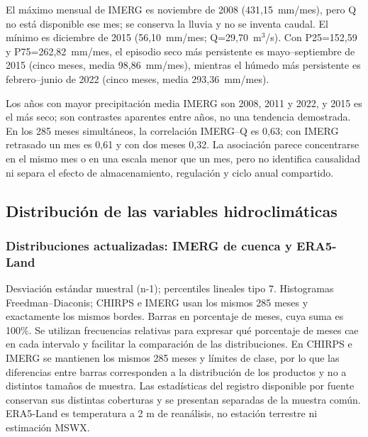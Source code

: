 \documentclass[10pt,a4paper]{article}
\begin{document}
El máximo mensual de IMERG es noviembre de 2008 (431,15~mm/mes), pero Q no está disponible ese mes; se conserva la lluvia y no se inventa caudal. El mínimo es diciembre de 2015 (56,10~mm/mes; Q=29,70~m$^3$/s). Con P25=152,59 y P75=262,82~mm/mes, el episodio seco más persistente es mayo--septiembre de 2015 (cinco meses, media 98,86~mm/mes), mientras el húmedo más persistente es febrero--junio de 2022 (cinco meses, media 293,36~mm/mes).

Los años con mayor precipitación media IMERG son 2008, 2011 y 2022, y 2015 es el más seco; son contrastes aparentes entre años, no una tendencia demostrada. En los 285 meses simultáneos, la correlación IMERG--Q es 0,63; con IMERG retrasado un mes es 0,61 y con dos meses 0,32. La asociación parece concentrarse en el mismo mes o en una escala menor que un mes, pero no identifica causalidad ni separa el efecto de almacenamiento, regulación y ciclo anual compartido.



\subsection{Distribución de las variables hidroclimáticas}
\subsubsection*{Distribuciones actualizadas: IMERG de cuenca y ERA5-Land}
Desviación estándar muestral (n-1); percentiles lineales tipo 7. Histogramas Freedman--Diaconis; CHIRPS e IMERG usan los mismos 285 meses y exactamente los mismos bordes. Barras en porcentaje de meses, cuya suma es 100\%. Se utilizan frecuencias relativas para expresar qué porcentaje de meses cae en cada intervalo y facilitar la comparación de las distribuciones. En CHIRPS e IMERG se mantienen los mismos 285 meses y límites de clase, por lo que las diferencias entre barras corresponden a la distribución de los productos y no a distintos tamaños de muestra. Las estadísticas del registro disponible por fuente conservan sus distintas coberturas y se presentan separadas de la muestra común. ERA5-Land es temperatura a 2 m de reanálisis, no estación terrestre ni estimación MSWX.
\end{document}
